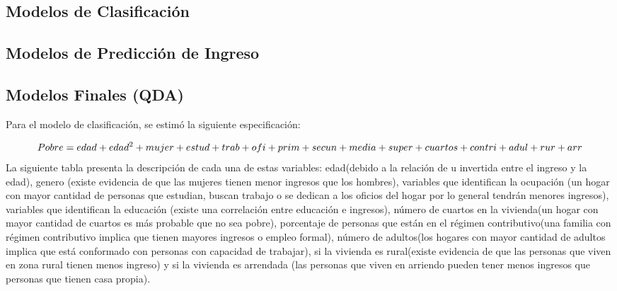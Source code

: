 \documentclass[
  11pt,
  letterpaper,
]{article}
\begin{document}
\hypertarget{modelos-de-clasificaciuxf3n}{%
\subsection{Modelos de Clasificación}\label{modelos-de-clasificaciuxf3n}}

\hypertarget{modelos-de-predicciuxf3n-de-ingreso}{%
\subsection{Modelos de Predicción de Ingreso}\label{modelos-de-predicciuxf3n-de-ingreso}}

\hypertarget{modelos-finales-qda}{%
\subsection{Modelos Finales (QDA)}\label{modelos-finales-qda}}

Para el modelo de clasificación, se estimó la siguiente especificación:

\[
\small Pobre= edad + edad^2 + mujer + estud+ trab + 
ofi + prim + secun+ media +super+cuartos+contri+ adul+rur+arr
\]
La siguiente tabla presenta la descripción de cada una de estas variables: edad(debido a la relación de u invertida entre el ingreso y la edad), genero (existe evidencia de que las mujeres tienen menor ingresos que los hombres), variables que identifican la ocupación (un hogar con mayor cantidad de personas que estudian, buscan trabajo o se dedican a los oficios del hogar por lo general tendrán menores ingresos), variables que identifican la educación (existe una correlación entre educación e ingresos), número de cuartos en la vivienda(un hogar con mayor cantidad de cuartos es más probable que no sea pobre), porcentaje de personas que están en el régimen contributivo(una familia con régimen contributivo implica que tienen mayores ingresos o empleo formal), número de adultos(los hogares con mayor cantidad de adultos implica que está conformado con personas con capacidad de trabajar), si la vivienda es rural(existe evidencia de que las personas que viven en zona rural tienen menos ingreso) y si la vivienda es arrendada (las personas que viven en arriendo pueden tener menos ingresos que personas que tienen casa propia).
\end{document}
